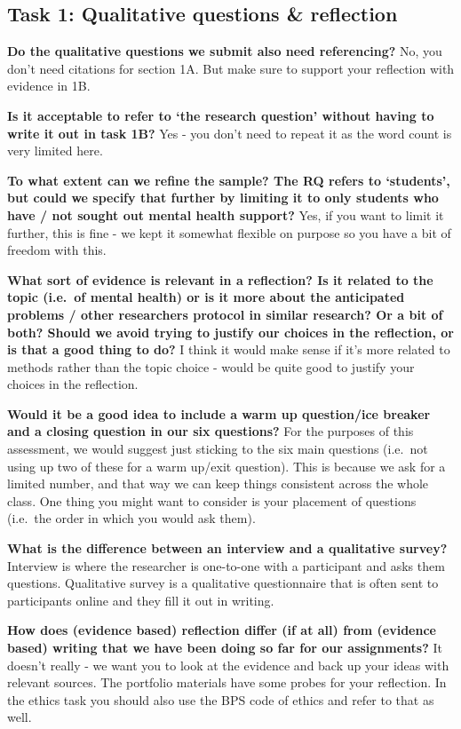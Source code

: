 \documentclass[
  english,
  letterpaper,
  DIV=11,
  numbers=noendperiod]{scrreprt}
\begin{document}
\subsection{Task 1: Qualitative questions \&
reflection}\label{task-1-qualitative-questions-reflection}

\textbf{Do the qualitative questions we submit also need referencing?}
No, you don't need citations for section 1A. But make sure to support
your reflection with evidence in 1B.

\textbf{Is it acceptable to refer to `the research question' without
having to write it out in task 1B?} Yes - you don't need to repeat it as
the word count is very limited here.

\textbf{To what extent can we refine the sample? The RQ refers to
`students', but could we specify that further by limiting it to only
students who have / not sought out mental health support?} Yes, if you
want to limit it further, this is fine - we kept it somewhat flexible on
purpose so you have a bit of freedom with this.

\textbf{What sort of evidence is relevant in a reflection? Is it related
to the topic (i.e.~of mental health) or is it more about the anticipated
problems / other researchers protocol in similar research? Or a bit of
both? Should we avoid trying to justify our choices in the reflection,
or is that a good thing to do?} I think it would make sense if it's more
related to methods rather than the topic choice - would be quite good to
justify your choices in the reflection.

\textbf{Would it be a good idea to include a warm up question/ice
breaker and a closing question in our six questions?} For the purposes
of this assessment, we would suggest just sticking to the six main
questions (i.e.~not using up two of these for a warm up/exit question).
This is because we ask for a limited number, and that way we can keep
things consistent across the whole class. One thing you might want to
consider is your placement of questions (i.e.~the order in which you
would ask them).

\textbf{What is the difference between an interview and a qualitative
survey?} Interview is where the researcher is one-to-one with a
participant and asks them questions. Qualitative survey is a qualitative
questionnaire that is often sent to participants online and they fill it
out in writing.

\textbf{How does (evidence based) reflection differ (if at all) from
(evidence based) writing that we have been doing so far for our
assignments?} It doesn't really - we want you to look at the evidence
and back up your ideas with relevant sources. The portfolio materials
have some probes for your reflection. In the ethics task you should also
use the BPS code of ethics and refer to that as well.
\end{document}
